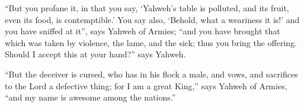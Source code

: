 {“But you profane it, in that you say, ‘Yahweh’s table is polluted, and its fruit, even its food, is contemptible.’
You say also, ‘Behold, what a weariness it is!’ and you have sniffed at it”, says Yahweh of Armies; “and you have brought that which was taken by violence, the lame, and the sick; thus you bring the offering. Should I accept this at your hand?” says Yahweh.
\par }{\PP {}“But the deceiver is cursed, who has in his flock a male, and vows, and sacrifices to the Lord a defective thing; for I am a great King,” says Yahweh of Armies, “and my name is awesome among the nations.”

}
